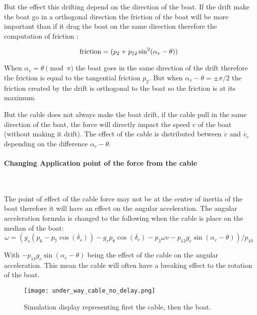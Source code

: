 But the effect this drifting depend on the direction of the boat.
If the drift make the boat go in a orthogonal direction the friction of the boat will be more important than if it
drag the boat on the same direction therefore the computation of friction :

\begin{equation}
\textnormal{friction} = (p_2+p_{12} \sin^2(\alpha_v-\theta))
\end{equation}

When $\alpha_v = \theta \pmod{\pi}$ the boat goes in the same direction of the drift therefore the friction is equal to the tangential friction $p_2$. But when $\alpha_v -\theta =\pm \pi/2$ the friction created by the drift is orthogonal to the boat so the friction is at its maximum.

But the cable does not always make the boat drift, if the cable pull in the same direction of the boat, the force 
will directly impact the speed  $v$ of the boat (without making it drift). The effect of the cable is distributed between $\dot{v}$ and $\dot{v_c}$ depending on the difference $\alpha_c -\theta$.

\paragraph*{Changing Application point of the force from the cable}
~\\
\vskip1mm
\hskip7mm
 
The point of effect of the cable force may not be at the center of inertia of the boat therefore it will
have an effect on the angular acceleration. The angular acceleration formula is changed to the following  when
the cable is place on the median of the boat:
\begin{equation}
\dot{\omega} =
(g_s(p_6-p_7\cos(\delta_s))-g_r p_8 \cos(\delta_r)-p_3 \omega v -p_{13} g_c \sin(\alpha_c-\theta))/p_{10}
\end{equation}

With $-p_{13} g_c \sin(\alpha_c-\theta)$ being the effect of the cable on the angular acceleration.
This mean the cable will often have a breaking effect to the rotation of the boat.

\begin{figure}[H]
\centering
    \texttt{[image: under\_way\_cable\_no\_delay.png]}
    \caption{Simulation display representing first the cable, then the boat.}
    \label{fig:3wayBoat}
\end{figure}

